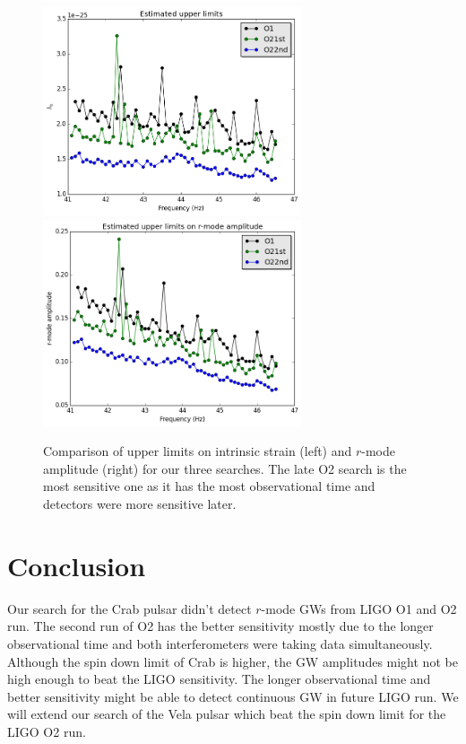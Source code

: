 \documentclass{ttuthes2007}
\begin{document}
\begin{figure}[h!] 
\includegraphics[width=3in]{figure/Crabupper.png}
\includegraphics[width=3in]{figure/modeamplitude.png}

\caption{Comparison of upper limits on intrinsic strain (left) and $r$-mode
amplitude (right) for our three searches. The late O2 search is the most
sensitive one as it has the most observational
time and detectors were more sensitive later.} 
\label{fig:UL}
\end{figure}


\section{Conclusion} 

Our search for the Crab pulsar didn't detect $r$-mode \acp{GW} from \ac{LIGO}
\ac{O1} and \ac{O2} run. The second run of \ac{O2} has the better sensitivity
mostly due to the longer observational time and both interferometers were taking
data simultaneously. Although the spin down limit of Crab is higher, the \ac{GW}
amplitudes might not be high enough to beat the LIGO sensitivity. The longer
observational time and better sensitivity might be able to detect continuous
\ac{GW} in future LIGO run.  We will extend our search of the Vela pulsar which
beat the spin down limit for the LIGO \ac{O2} run.  
\end{document}
